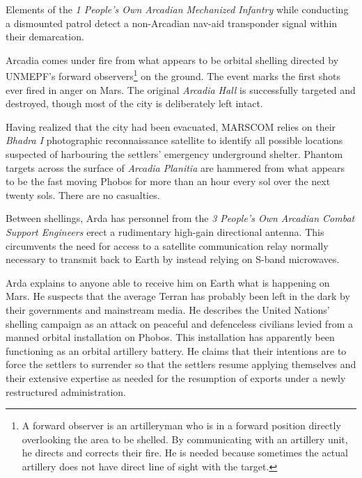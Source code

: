 

Elements of the {\it 1 People's Own Arcadian Mechanized Infantry} while conducting a dismounted patrol detect a non-Arcadian nav-aid transponder signal within their demarcation.
\StopTimelineDate

Arcadia comes under fire from what appears to be orbital shelling directed by UNMEPF's forward observers\footnote{A forward observer is an artilleryman who is in a forward position directly overlooking the area to be shelled. By communicating with an artillery unit, he directs and corrects their fire. He is needed because sometimes the actual artillery does not have direct line of sight with the target.} on the ground. The event marks the first shots ever fired in anger on Mars. The original {\it Arcadia Hall} is successfully targeted and destroyed, though most of the city is deliberately left intact. 

Having realized that the city had been evacuated, MARSCOM relies on their {\it Bhadra I} photographic reconnaissance satellite to identify all possible locations suspected of harbouring the settlers' emergency underground shelter. Phantom targets across the surface of {\it Arcadia Planitia} are hammered from what appears to be the fast moving Phobos for more than an hour every sol over the next twenty sols. There are no casualties.

Between shellings, Arda has personnel from the {\it 3 People's Own Arcadian Combat Support Engineers} erect a rudimentary high-gain directional antenna. This circumvents the need for access to a satellite communication relay normally necessary to transmit back to Earth by instead relying on S-band microwaves. 

Arda explains to anyone able to receive him on Earth what is happening on Mars. He suspects that the average Terran has probably been left in the dark by their governments and mainstream media. He describes the United Nations' shelling campaign as an attack on peaceful and defenceless civilians levied from a manned orbital installation on Phobos. This installation has apparently been functioning as an orbital artillery battery. He claims that their intentions are to force the settlers to surrender so that the settlers resume applying themselves and their extensive expertise as needed for the resumption of exports under a newly restructured administration.

